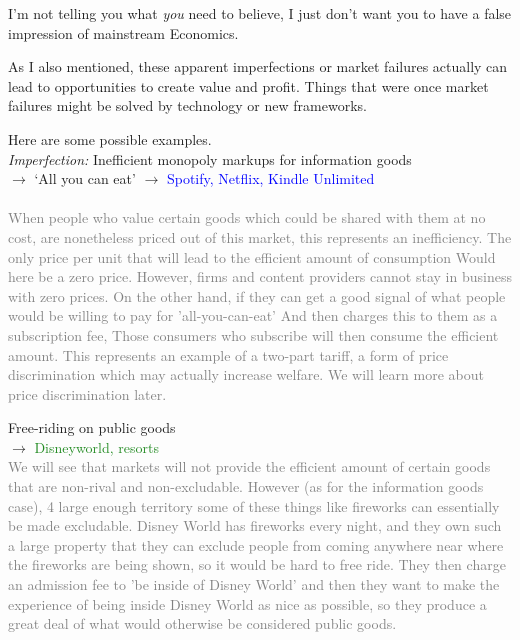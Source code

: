 \documentclass[]{article}
\begin{document}
I'm not telling you what \emph{you} need to believe, I just don't want you to have a false impression of mainstream Economics.

As I also mentioned, these apparent imperfections or market failures actually can lead to opportunities to create value and profit. Things that were once market failures might be solved by technology or new frameworks.

Here are some possible examples.\\

\emph{Imperfection:} Inefficient monopoly markups for information goods\\

\(\rightarrow\) `All you can eat' \(\rightarrow\) \textcolor{blue}{Spotify, Netflix, Kindle Unlimited}\\
~\\

\textcolor{gray}{When people who value certain goods which could be shared with them at no cost, are nonetheless priced out of this market, this represents an inefficiency. The only price per unit that will lead to the efficient amount of consumption Would here be a zero price. However, firms and content providers cannot stay in business with zero prices. On the other hand, if they can get a good signal of what people would be willing to pay for 'all-you-can-eat' And then charges this to them as a subscription fee, Those consumers who subscribe will then consume the efficient amount. This represents an example of a two-part tariff, a form of price discrimination which may actually increase welfare. We will learn more about price discrimination later.}

Free-riding on public goods\\

\(\rightarrow\) \textcolor{ForestGreen}{Disneyworld, resorts}\\

\textcolor{gray}{We will see that markets will not provide the efficient amount of certain goods that are non-rival and non-excludable. However (as for the information goods case), 4 large enough territory some of these things like fireworks can essentially be made excludable. Disney World has fireworks every night, and they own such a large property that they can exclude people from coming anywhere near where the fireworks are being shown, so it would be hard to free ride.  They then charge an admission fee to 'be inside of Disney World' and then they want to make the experience of being inside Disney World as nice as possible, so they produce a great deal of what would otherwise be considered public goods.}
\end{document}
